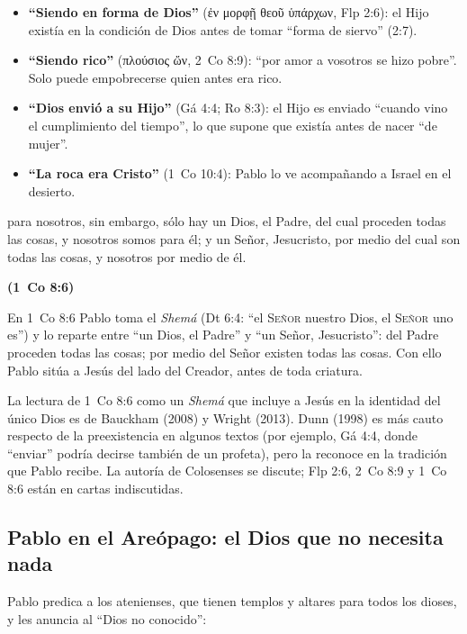 \documentclass[11pt,letterpaper]{article}
\newcommand{\grc}[1]{\foreignlanguage{ancientgreek}{#1}}
\newcommand{\SENOR}{\textsc{Señor}}
\newcommand{\fuente}[1]{\par\hfill{\upshape\bfseries\small\textcolor{azul}{#1}}}
\begin{document}
\begin{itemize}
\item \textbf{``Siendo en forma de Dios''} (\grc{ἐν μορφῇ θεοῦ ὑπάρχων}, Flp 2:6): el Hijo existía en la condición de Dios antes de tomar ``forma de siervo'' (2:7).
\item \textbf{``Siendo rico''} (\grc{πλούσιος ὤν}, 2~Co 8:9): ``por amor a vosotros se hizo pobre''. Solo puede empobrecerse quien antes era rico.
\item \textbf{``Dios envió a su Hijo''} (Gá 4:4; Ro 8:3): el Hijo es enviado ``cuando vino el cumplimiento del tiempo'', lo que supone que existía antes de nacer ``de mujer''.
\item \textbf{``La roca era Cristo''} (1~Co 10:4): Pablo lo ve acompañando a Israel en el desierto.
\end{itemize}

\begin{cita}para nosotros, sin embargo, sólo hay un Dios, el Padre, del cual proceden todas las cosas, y nosotros somos para él; y un Señor, Jesucristo, por medio del cual son todas las cosas, y nosotros por medio de él.\fuente{(1~Co 8:6)}\end{cita}

En 1~Co 8:6 Pablo toma el \emph{Shemá} (Dt 6:4: ``el \SENOR{} nuestro Dios, el \SENOR{} uno es'') y lo reparte entre ``un Dios, el Padre'' y ``un Señor, Jesucristo'': del Padre proceden todas las cosas; por medio del Señor existen todas las cosas. Con ello Pablo sitúa a Jesús del lado del Creador, antes de toda criatura.

\begin{nota}[Precisión]
La lectura de 1~Co 8:6 como un \emph{Shemá} que incluye a Jesús en la identidad del único Dios es de Bauckham (2008) y Wright (2013). Dunn (1998) es más cauto respecto de la preexistencia en algunos textos (por ejemplo, Gá 4:4, donde ``enviar'' podría decirse también de un profeta), pero la reconoce en la tradición que Pablo recibe. La autoría de Colosenses se discute; Flp 2:6, 2~Co 8:9 y 1~Co 8:6 están en cartas indiscutidas.
\end{nota}

\subsection{Pablo en el Areópago: el Dios que no necesita nada}
Pablo predica a los atenienses, que tienen templos y altares para todos los dioses, y les anuncia al ``Dios no conocido'':
\end{document}
